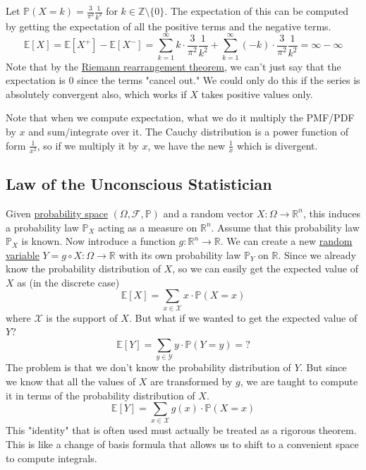   \begin{example}
    \label{ex:undefined-expectation}
    Let $\mathbb{P}(X = k) = \frac{3}{\pi^2} \frac{1}{k^2}$ for $k \in \mathbb{Z}\setminus \{0\}$. The expectation of this can be computed by getting the expectation of all the positive terms and the negative terms. 
    \begin{equation}
      \mathbb{E}[X] = \mathbb{E}[X^+] - \mathbb{E}[X^{-}] = \sum_{k=1}^\infty k \cdot \frac{3}{\pi^2} \frac{1}{k^2} + \sum_{k=1}^\infty (-k) \cdot \frac{3}{\pi^2} \frac{1}{k^2} = \infty - \infty
    \end{equation}
    Note that by the \hyperref[real-thm:riemann-rearrangement-theorem]{Riemann rearrangement theorem}, we can't just say that the expectation is $0$ since the terms "cancel out." We could only do this if the series is absolutely convergent also, which works if $X$ takes positive values only. 
  \end{example}

  Note that when we compute expectation, what we do it multiply the PMF/PDF by $x$ and sum/integrate over it. The Cauchy distribution is a power function of form $\frac{1}{x^2}$, so if we multiply it by $x$, we have the new $\frac{1}{x}$ which is divergent. 

\subsection{Law of the Unconscious Statistician}

	Given \hyperref[def:probability-space]{probability space} $(\Omega, \mathcal{F}, \mathbb{P})$ and a random vector $X: \Omega \rightarrow \mathbb{R}^n$, this induces a probability law $\mathbb{P}_X$ acting as a measure on $\mathbb{R}^n$. Assume that this probability law $\mathbb{P}_X$ is known. Now introduce a function $g: \mathbb{R}^n \rightarrow \mathbb{R}$. We can create a new \hyperref[def:random-variable]{random variable} $Y = g \circ X : \Omega \rightarrow \mathbb{R}$ with its own probability law $\mathbb{P}_Y$ on $\mathbb{R}$. Since we already know the probability distribution of $X$, so we can easily get the expected value of $X$ as (in the discrete case) 
	\begin{equation}
		\mathbb{E}[X] = \sum_{x \in \mathcal{X}} x \cdot \mathbb{P}(X = x)
	\end{equation}
	where $\mathcal{X}$ is the support of $X$. But what if we wanted to get the expected value of $Y$? 
	\begin{equation}
		\mathbb{E}[Y] = \sum_{y \in \mathcal{Y}} y \cdot \mathbb{P}(Y = y) = ?
	\end{equation}
	The problem is that we don't know the probability distribution of $Y$. But since we know that all the values of $X$ are transformed by $g$, we are taught to compute it in terms of the probability distribution of $X$. 
	\begin{equation}
		\mathbb{E}[Y] = \sum_{x \in \mathcal{X}} g(x) \cdot \mathbb{P}(X = x)
	\end{equation}
	This "identity" that is often used must actually be treated as a rigorous theorem. This is like a change of basis formula that allows us to shift to a convenient space to compute integrals. 

